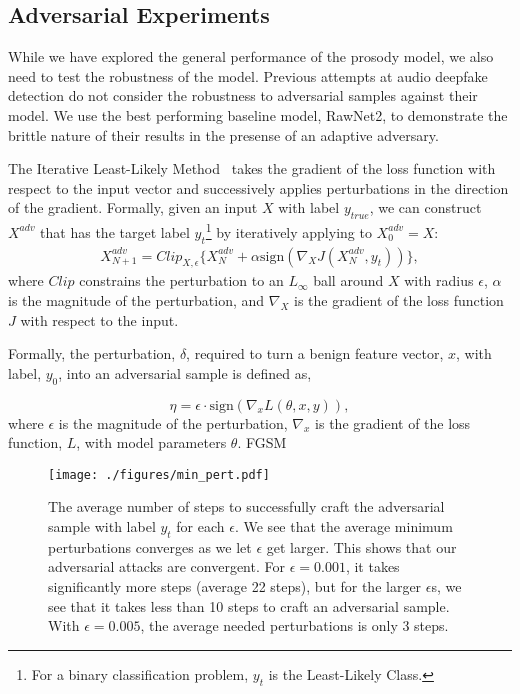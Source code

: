 \documentclass[10pt, journal, anonymous=true]{IEEEtran}
\begin{document}
\subsection{Adversarial Experiments}
While we have explored the general performance of the prosody model, we also need to test the robustness of the model. Previous attempts at audio deepfake
detection do not consider the robustness to adversarial samples
against their model. We use the best performing baseline model, RawNet2, 
to demonstrate the brittle nature of their results in the presense of an
adaptive adversary.

The Iterative Least-Likely Method~\cite{kurakin2016adversarial}
takes the gradient of the loss function with respect
to the input vector and successively applies perturbations in the direction of the gradient.
Formally, given an input $X$ with label $y_{true}$, we can
construct $X^{adv}$ that has the target label $y_{t}$\footnote{For a binary classification problem, $y_{t}$ is the Least-Likely Class.} by iteratively applying to $X_{0}^{adv}= X$:
\begin{equation*}
\begin{matrix}
  X^{adv}_{N+1} = Clip_{X,\epsilon}\{X^{adv}_{N} + \alpha\text{sign}(\nabla_X J(X^{adv}_{N}, y_{t})) \},
\end{matrix}
\end{equation*}
where $Clip$ constrains the perturbation to an $L_{\infty}$ ball
around $X$ with radius $\epsilon$, $\alpha$ is the magnitude
of the perturbation, and $\nabla_X$ is the gradient of the loss function $J$
with respect to the input.



Formally, the perturbation, $\delta$, required to
turn a benign feature vector, $x$, with label, $y_{0}$, into an adversarial sample
is defined as, 

\begin{equation*}
\eta = \epsilon\cdot \text{sign}(\nabla_xL(\theta,x,y)),
\end{equation*}
where $\epsilon$ is the magnitude of the perturbation,
$\nabla_x$ is the gradient of the loss function, $L$, with
model parameters $\theta$.
FGSM 
\begin{figure}[!t]
	\begin{center}
			\texttt{[image: ./figures/min\_pert.pdf]}
			\vspace{-0.3cm}
			\caption{ 
				The average number of steps to successfully craft the adversarial sample with label $y_{t}$ for each $\epsilon$. 
				We see that the average minimum perturbations converges as we let $\epsilon$ get larger. This shows that
				our adversarial attacks are convergent.
				For $\epsilon=0.001$, it takes significantly more steps (average 22 steps), but for the larger $\epsilon$s,
				we see that it takes less than 10 steps to craft an adversarial sample. With $\epsilon=0.005$, the average 
				needed perturbations is only 3 steps.
			} 
			\label{fig:min_pert}
		\end{center}
	\end{figure}
\end{document}
